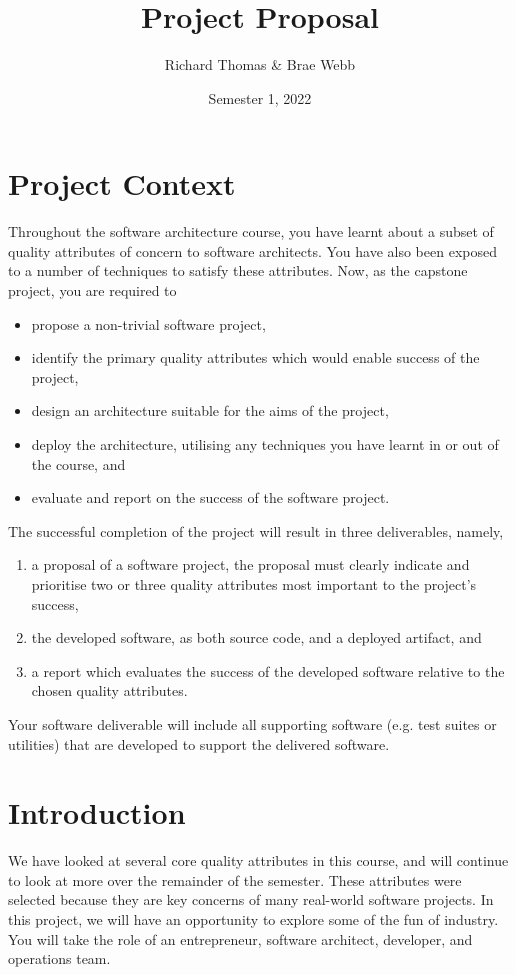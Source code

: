 \documentclass{csse4400}
\title{Project Proposal}
\author{Richard Thomas \& Brae Webb}
\date{Semester 1, 2022}
\begin{document}
\maketitle

\section*{Project Context}
Throughout the software architecture course,
you have learnt about a subset of quality attributes of concern to software architects.
You have also been exposed to a number of techniques to satisfy these attributes.
Now, as the capstone project, you are required to
\begin{itemize}
    \item propose a non-trivial software project,
    \item identify the primary quality attributes which would enable success of the project,
    \item design an architecture suitable for the aims of the project,
    \item deploy the architecture, utilising any techniques you have learnt in or out of the course, and
    \item evaluate and report on the success of the software project.
\end{itemize}

\noindent
The successful completion of the project will result in three deliverables, namely,
\begin{enumerate}[label=\roman*]
    \item a proposal of a software project, the proposal must clearly indicate and prioritise two or three quality attributes most important to the project's success,
    \item the developed software,	 as both source code, and a deployed artifact, and
    \item a report which evaluates the success of the developed software relative to the chosen quality attributes.
\end{enumerate}

\noindent
Your software deliverable will include all supporting software (e.g. test suites or utilities) that are developed to support the delivered software.

\section{Introduction}
We have looked at several core quality attributes in this course, and will continue to look at more over the remainder of the semester.
These attributes were selected because they are key concerns of many real-world software projects.
In this project, we will have an opportunity to explore some of the fun of industry.
You will take the role of an entrepreneur, software architect, developer, and operations team.
\end{document}
